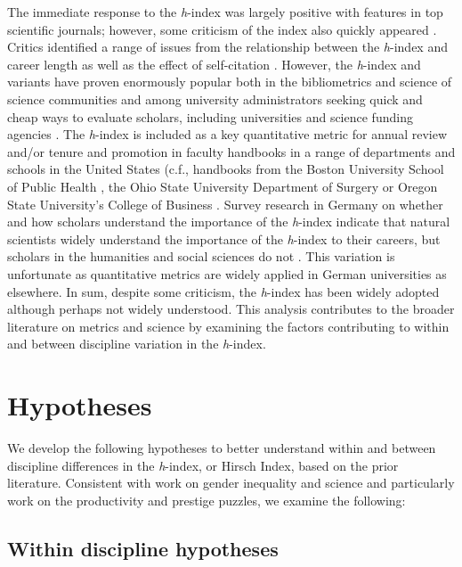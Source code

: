 \documentclass[
  10pt,
  letterpaper,
]{article}
\begin{document}
The immediate response to the \emph{h}-index was largely positive with
features in top scientific journals; however, some criticism of the
index also quickly appeared \citep{barnes_hindex_2017}. Critics
identified a range of issues from the relationship between the
\emph{h}-index and career length as well as the effect of self-citation
\citep[see][ among others]{kelly_index_2006, purvis_index_2006}.
However, the \emph{h}-index and variants have proven enormously popular
both in the bibliometrics and science of science communities and among
university administrators seeking quick and cheap ways to evaluate
scholars, including universities and science funding agencies
\citep{barnes_hindex_2017}. The \emph{h}-index is included as a key
quantitative metric for annual review and/or tenure and promotion in
faculty handbooks in a range of departments and schools in the United
States (c.f., handbooks from the Boston University School of Public
Health \citep{bostonuniversity_boston_2018}, the Ohio State University
Department of Surgery \citep{ohiostateuniversity_department_2014} or
Oregon State University's College of Business
\citep{oregonstateuniversity_oregon_2020}. Survey research in Germany on
whether and how scholars understand the importance of the \emph{h}-index
indicate that natural scientists widely understand the importance of the
\emph{h}-index to their careers, but scholars in the humanities and
social sciences do not \citep{kamrani_researchers_2021}. This variation
is unfortunate as quantitative metrics are widely applied in German
universities as elsewhere. In sum, despite some criticism, the
\emph{h}-index has been widely adopted although perhaps not widely
understood. This analysis contributes to the broader literature on
metrics and science by examining the factors contributing to within and
between discipline variation in the \emph{h}-index.

\hypertarget{hypotheses}{%
\section{Hypotheses}\label{hypotheses}}

We develop the following hypotheses to better understand within and
between discipline differences in the \emph{h}-index, or Hirsch Index,
based on the prior literature. Consistent with work on gender inequality
and science and particularly work on the productivity and prestige
puzzles, we examine the following:

\hypertarget{within-discipline-hypotheses}{%
\subsection{Within discipline
hypotheses}\label{within-discipline-hypotheses}}
\end{document}
